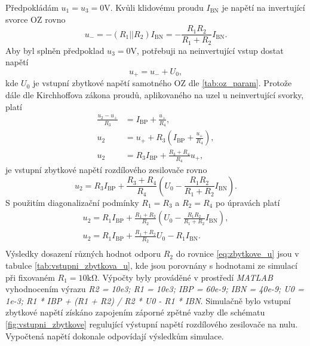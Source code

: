 \documentclass[twoside]{article}
\begin{document}
Předpokládám $u_1 = u_3 = 0 \si{\volt}$. Kvůli klidovému proudu $I_\text{BN}$ je napětí na invertující
svorce OZ rovno
\begin{equation}
    u_- = - (R_1 \vert \vert R_2) I_\text{BN} =  - \frac{R_1 R_2}{R_1 + R_2} I_\text{BN}.
\end{equation}
Aby byl splněn předpoklad $u_3 = 0 \si{\volt}$, potřebuji na neinvertující vstup dostat napětí
\begin{equation}
    u_+ = u_- + U_0,
\end{equation}
kde $U_0$ je vstupní zbytkové napětí samotného OZ dle \ref{tab:oz_param}.
Protože dále dle Kirchhoffova zákona proudů, aplikovaného na uzel u neinvertující svorky, platí 
\begin{equation}
    \begin{split}
        \frac{u_2 - u_+}{R_3} &= I_\text{BP} + \frac{u_+}{R_4}, \\
        u_2 &= u_+ + R_3 (I_\text{BP} + \frac{u_+}{R_4}), \\
        u_2 &= R_3 I_\text{BP} + \frac{R_3 + R_4}{R_4}u_+,
    \end{split}
\end{equation}
je vstupní zbytkové napětí rozdílového zesilovače rovno
\begin{equation}
    u_2 = R_3 I_\text{BP} + \frac{R_3 + R_4}{R_4} (U_0 - \frac{R_1 R_2}{R_1 + R_2} I_\text{BN}).
\end{equation}
S použitím diagonalizační podmínky $R_1 = R_3$ a $R_2 = R_4$ po úpravách platí
\begin{equation}
    \begin{split}
        u_2 = R_1 I_\text{BP} + \frac{R_1 + R_2}{R_2} (U_0 - \frac{R_1 R_2}{R_1 + R_2} I_\text{BN}), \\
        u_2 = R_1 I_\text{BP} + \frac{R_1 + R_2}{R_2} U_0 - R_1 I_\text{BN}. \\
    \end{split}
    \label{eq:zbytkove_u}
\end{equation}
Výsledky dosazení různých hodnot odporu $R_2$ do rovnice \eqref{eq:zbytkove_u} jsou v tabulce \ref{tab:vstupni_zbytkova_u},
kde jsou porovnány s hodnotami ze simulací při fixovaném $R_1 = 10 \si{\kilo\ohm}$. Výpočty byly prováděné v prostředí
\textit{MATLAB} vyhodnocením výrazu \textit{R2 = 10e3; R1 = 10e3; IBP = 60e-9; IBN = 40e-9; U0 = 1e-3; R1 * IBP + (R1 + R2) / R2 * U0 - R1 * IBN}.
Simulačně bylo vstupní zbytkové napětí získáno zapojením záporné zpětné vazby dle schématu \ref{fig:vstupni_zbytkove}
regulující výstupní napětí rozdílového zesilovače na nulu. Vypočtená napětí dokonale odpovídají výsledkům simulace.
\end{document}
